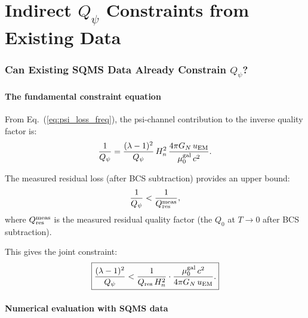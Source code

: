 \documentclass[11pt]{article}
\newcommand{\lam}{\lambda}
\newcommand{\Qpsi}{Q_\psi}
\newcommand{\Heff}{H_n}
\newcommand{\muG}{\mu_0^{\rm gal}}
\newcommand{\GN}{G_N}
\theoremstyle{definition}
\theoremstyle{remark}
\begin{document}
\part{Indirect $\Qpsi$ Constraints from Existing Data}
\label{part:Qpsi}

\section{Can Existing SQMS Data Already Constrain $\Qpsi$?}
\label{sec:existing_data}

\subsection{The fundamental constraint equation}

From Eq.~(\ref{eq:psi_loss_freq}), the psi-channel contribution to the
inverse quality factor is:
\begin{equation}
\frac{1}{Q_\psi} = \frac{(\lam-1)^2}{\Qpsi}\,\Heff^2
\,\frac{4\pi\GN\,u_{\rm EM}}{\muG\,c^2}.
\label{eq:Qpsi_constraint_basic}
\end{equation}

The measured residual loss (after BCS subtraction) provides an upper
bound:
\begin{equation}
\frac{1}{Q_\psi} < \frac{1}{Q_{\rm res}^{\rm meas}},
\end{equation}
where $Q_{\rm res}^{\rm meas}$ is the measured residual quality factor
(the $Q_0$ at $T \to 0$ after BCS subtraction).

This gives the joint constraint:
\begin{equation}
\boxed{
\frac{(\lam-1)^2}{\Qpsi} < \frac{1}{Q_{\rm res}\,\Heff^2}
\cdot\frac{\muG\,c^2}{4\pi\GN\,u_{\rm EM}}.
}
\label{eq:joint_constraint}
\end{equation}

\subsection{Numerical evaluation with SQMS data}
\end{document}
